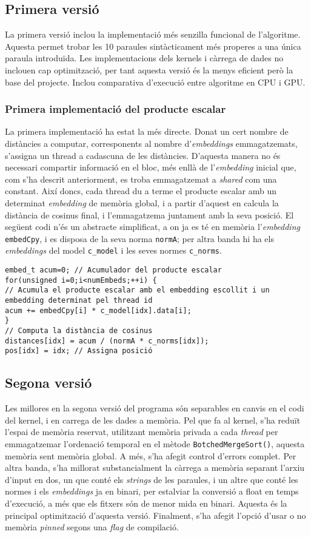 \documentclass[catalan,10pt,a4paper]{article}
\begin{document}
\subsection*{Primera versió}
La primera versió inclou la implementació més senzilla funcional de l'algoritme. Aquesta permet trobar les 10 paraules sintàcticament més properes a una única paraula introduïda.
Les implementacions dels kernels i càrrega de dades no inclouen cap optimització, per tant aquesta versió és la menys eficient però la base del projecte.
Inclou comparativa d'execució entre algoritme en CPU i GPU.
\subsubsection*{Primera implementació del producte escalar}
La primera implementació ha estat la més directe. Donat un cert nombre de distàncies a computar, corresponents al nombre d'\textit{embeddings} emmagatzemats, s'assigna un thread a cadascuna de les distàncies. D'aquesta manera no és necessari compartir informació en el bloc, més enllà de l'\textit{embedding} inicial que, com s'ha descrit anteriorment, es troba emmagatzemat a \textit{shared} com una constant.
Així doncs, cada thread du a terme el producte escalar amb un determinat \textit{embedding} de memòria global, i a partir d'aquest en calcula la distància de cosinus final, i l'emmagatzema juntament amb la seva posició. 
El següent codi n'és un abstracte simplificat, a on ja es té en memòria l'\textit{embedding} \texttt{embedCpy}, i es disposa de la seva norma \texttt{normA}; per altra banda hi ha els \textit{embeddings} del model \texttt{c_model} i les seves normes \texttt{c_norms}. 
\begin{verbatim}
embed_t acum=0; // Acumulador del producte escalar
for(unsigned i=0;i<numEmbeds;++i) {
// Acumula el producte escalar amb el embedding escollit i un embedding determinat pel thread id
acum += embedCpy[i] * c_model[idx].data[i];
}
// Computa la distància de cosinus
distances[idx] = acum / (normA * c_norms[idx]);
pos[idx] = idx; // Assigna posició
\end{verbatim}
\subsection*{Segona versió}
Les millores en la segona versió del programa són separables en canvis en el codi del kernel, i en carrega de les dades a memòria.
Pel que fa al kernel, s'ha reduït l'espai de memòria reservat, utilitzant memòria privada a cada \textit{thread} per emmagatzemar l'ordenació temporal en el mètode \verb|BotchedMergeSort()|, aquesta memòria sent memòria global. A més, s'ha afegit control d'errors complet.
Per altra banda, s'ha millorat substancialment la càrrega a memòria separant l'arxiu d'input en dos, un que conté els \textit{strings} de les paraules, i un altre que conté les normes i els \textit{embeddings} ja en binari, per estalviar la conversió a float en temps d'execució, a més que els fitxers són de menor mida en binari. Aquesta és la principal optimització d'aquesta versió.
Finalment, s'ha afegit l'opció d'usar o no memòria \textit{pinned} segons una \textit{flag} de compilació.
\end{document}
